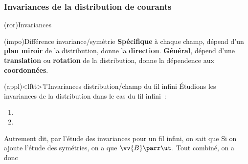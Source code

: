 \documentclass[../../main/main.tex]{subfiles}
\begin{document}
\subsubsection{Invariances de la distribution de courants}
\label{sssec:invdist}
\begin{tcb*}(ror){Invariances}
	\begin{center}
	\end{center}
\end{tcb*}

\begin{tcb*}[sidebyside, sidebyside align=top](impo){Différence invariance/symétrie}
	\textbf{Spécifique} à chaque champ, dépend d'un \textbf{plan miroir} de la
	distribution, donne la \textbf{direction}.
	\tcblower
	\textbf{Général}, dépend d'une \textbf{translation} ou \textbf{rotation} de
	la distribution, donne la dépendence aux \textbf{coordonnées}.
\end{tcb*}

\begin{tcb}(appl)<lftt>'l'{Invariances distribution/champ du fil infini}
	Étudions les invariances de la distribution dans le cas du fil infini~:
	\begin{enumerate}
		\item
		\item
	\end{enumerate}
	Autrement dit, par l'étude des invariances pour un fil infini, on
	sait que
	Si on ajoute l'étude des symétries, on a que $\vv{B}\parr \ut$. Tout combiné,
	on a donc
	\psw{%
		\[
			\boxed{\vv{B}(\Mr) = B(r)\ut}
		\]
	}%
	\vspace{-30pt}
\end{tcb}
\end{document}
